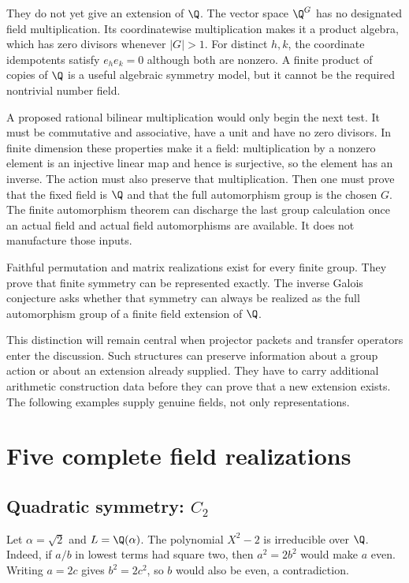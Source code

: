 They do not yet give an extension of $\Q$. The vector space $\Q^G$ has no designated field multiplication. Its coordinatewise multiplication makes it a product algebra, which has zero divisors whenever $|G|>1$. For distinct $h,k$, the coordinate idempotents satisfy $e_he_k=0$ although both are nonzero. A finite product of copies of $\Q$ is a useful algebraic symmetry model, but it cannot be the required nontrivial number field.

A proposed rational bilinear multiplication would only begin the next test. It must be commutative and associative, have a unit and have no zero divisors. In finite dimension these properties make it a field: multiplication by a nonzero element is an injective linear map and hence is surjective, so the element has an inverse. The action must also preserve that multiplication. Then one must prove that the fixed field is $\Q$ and that the full automorphism group is the chosen $G$. The finite automorphism theorem can discharge the last group calculation once an actual field and actual field automorphisms are available. It does not manufacture those inputs.

\begin{claimboundary}
Faithful permutation and matrix realizations exist for every finite group. They prove that finite symmetry can be represented exactly. The inverse Galois conjecture asks whether that symmetry can always be realized as the full automorphism group of a finite field extension of $\Q$.
\end{claimboundary}

This distinction will remain central when projector packets and transfer operators enter the discussion. Such structures can preserve information about a group action or about an extension already supplied. They have to carry additional arithmetic construction data before they can prove that a new extension exists. The following examples supply genuine fields, not only representations.

\chapter{Five complete field realizations}
\label{chap:g02-examples}

\section{Quadratic symmetry: $C_2$}

Let $\alpha=\sqrt2$ and $L=\Q(\alpha)$. The polynomial $X^2-2$ is irreducible over $\Q$. Indeed, if $a/b$ in lowest terms had square two, then $a^2=2b^2$ would make $a$ even. Writing $a=2c$ gives $b^2=2c^2$, so $b$ would also be even, a contradiction.


